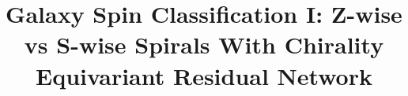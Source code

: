 \documentclass[twocolumn]{aastex631}
\begin{document}
\title{Galaxy Spin Classification I: Z-wise vs S-wise Spirals With Chirality Equivariant Residual Network}



\end{document}
